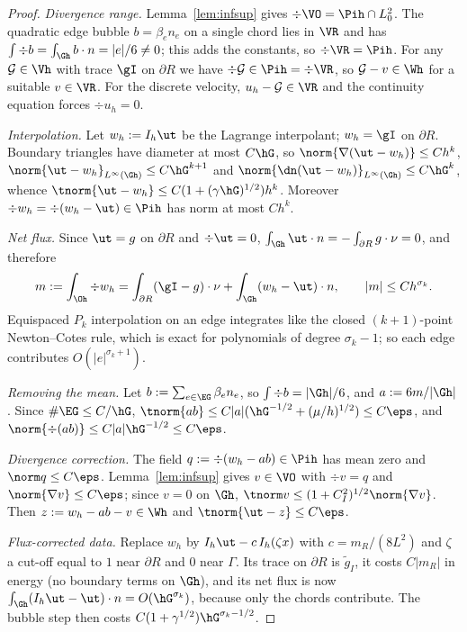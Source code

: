 \begin{proof}
\emph{Divergence range.} Lemma~\ref{lem:infsup} gives $\div\VO=\Pih\cap L^2_0$. The quadratic edge bubble $b=\beta_en_e$ on a single chord lies in $\VR$ and has $\int\div b=\int_{\Gh}b\cdot n=|e|/6\ne0$; this adds the constants, so $\div\VR=\Pih$. For any $\mathcal G\in\Vh$ with trace $\gI$ on $\partial R$ we have $\div\mathcal G\in\Pih=\div\VR$, so $\mathcal G-v\in\Wh$ for a suitable $v\in\VR$. For the discrete velocity, $u_h-\mathcal G\in\VR$ and the continuity equation forces $\div u_h=0$.

\emph{Interpolation.} Let $w_h:=I_h\ut$ be the Lagrange interpolant; $w_h=\gI$ on $\partial R$. Boundary triangles have diameter at most $C\hG$, so $\norm{\nabla(\ut-w_h)}\le Ch^k$, $\norm{\ut-w_h}_{L^\infty(\Gh)}\le C\hG^{k+1}$ and $\norm{\dn(\ut-w_h)}_{L^\infty(\Gh)}\le C\hG^k$, whence $\tnorm{\ut-w_h}\le C(1+(\gamma\hG)^{1/2})h^k$. Moreover $\div w_h=\div(w_h-\ut)\in\Pih$ has norm at most $Ch^k$.

\emph{Net flux.} Since $\ut=g$ on $\partial R$ and $\div\ut=0$, $\int_{\Gh}\ut\cdot n=-\int_{\partial R}g\cdot\nu=0$, and therefore
\[
m:=\int_{\Oh}\div w_h=\int_{\partial R}(\gI-g)\cdot\nu+\int_{\Gh}(w_h-\ut)\cdot n,\qquad |m|\le Ch^{\sigma_k}.
\]
Equispaced $P_k$ interpolation on an edge integrates like the closed $(k+1)$-point Newton--Cotes rule, which is exact for polynomials of degree $\sigma_k-1$; so each edge contributes $O(|e|^{\sigma_k+1})$.

\emph{Removing the mean.} Let $b:=\sum_{e\in\EG}\beta_en_e$, so $\int\div b=|\Gh|/6$, and $a:=6m/|\Gh|$. Since $\#\EG\le C/\hG$,
$\tnorm{ab}\le C|a|(\hG^{-1/2}+(\mu/h)^{1/2})\le C\eps$, and $\norm{\div(ab)}\le C|a|\hG^{-1/2}\le C\eps$.

\emph{Divergence correction.} The field $q:=\div(w_h-ab)\in\Pih$ has mean zero and $\norm q\le C\eps$. Lemma~\ref{lem:infsup} gives $v\in\VO$ with $\div v=q$ and $\norm{\nabla v}\le C\eps$; since $v=0$ on $\Gh$, $\tnorm v\le(1+C_I^2)^{1/2}\norm{\nabla v}$. Then $z:=w_h-ab-v\in\Wh$ and $\tnorm{\ut-z}\le C\eps$.

\emph{Flux-corrected data.} Replace $w_h$ by $I_h\ut-c\,I_h(\zeta x)$ with $c=m_R/(8L^2)$ and $\zeta$ a cut-off equal to $1$ near $\partial R$ and $0$ near $\Gamma$. Its trace on $\partial R$ is $\tilde g_I$, it costs $C|m_R|$ in energy (no boundary terms on $\Gh$), and its net flux is now $\int_{\Gh}(I_h\ut-\ut)\cdot n=O(\hG^{\sigma_k})$, because only the chords contribute. The bubble step then costs $C(1+\gamma^{1/2})\hG^{\sigma_k-1/2}$.
\end{proof}

